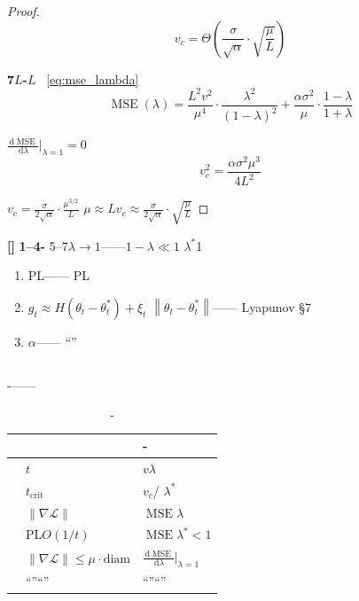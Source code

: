 \documentclass[11pt,a4paper]{article}
\theoremstyle{remark}
\DeclareMathOperator{\MSE}{MSE}
\newcommand{\norm}[1]{\left\lVert#1\right\rVert}
\newcommand{\dd}{\,\mathrm{d}}
\newcommand{\heuristic}{\textnormal{\textbf{[]}}}
\begin{document}
\begin{proof}
\begin{equation}
    v_c = \Theta\left(\frac{\sigma}{\sqrt{\alpha}} \cdot \sqrt{\frac{\mu}{L}}\right)
\end{equation}


\textbf{7$L$-}$L$
~\eqref{eq:mse_lambda}
\begin{equation}
    \MSE(\lambda) = \frac{L^2 v^2}{\mu^4} \cdot \frac{\lambda^2}{(1-\lambda)^2}
    + \frac{\alpha\sigma^2}{\mu} \cdot \frac{1-\lambda}{1+\lambda}
\end{equation}

$\frac{\dd \MSE}{\dd \lambda}\big|_{\lambda=1} = 0$
\begin{equation}
    v_c^2 = \frac{\alpha\sigma^2\mu^3}{4L^2}
\end{equation}

$v_c = \frac{\sigma}{2\sqrt{\alpha}} \cdot \frac{\mu^{3/2}}{L}$
$\mu \approx L$$v_c \approx \frac{\sigma}{2\sqrt{\alpha}} \cdot \sqrt{\frac{\mu}{L}}$

\end{proof}

\heuristic{} \textbf{1--4-}
5--7$\lambda \to 1$——$1-\lambda \ll 1$
$\lambda^*$1
\textbf{}
\begin{enumerate}[label=(\arabic*)]
    \item PL——
          PL
          
    \item $g_t \approx H(\theta_t - \theta_t^*) + \xi_t$
          $\norm{\theta_t - \theta_t^*}$——
          Lyapunov
          \S7
    \item $\alpha$——
          ``''
\end{enumerate}

\subsection{}

-——
\textbf{}

\begin{table}[htbp]
\centering
\caption{-}
\label{tab:phase_parallel}
\begin{tabular}{@{}lll@{}}
\toprule
\textbf{} & \textbf{} & \textbf{-} \\
\midrule
 & $t$ & $v$$\lambda$ \\
 & $t_{\text{crit}}$ & $v_c$/ $\lambda^*$ \\
 & $\|\nabla\mathcal{L}\|$ & $\MSE$$\lambda$ \\
 & PL$O(1/t)$ & $\MSE$$\lambda^*<1$ \\
 & $\|\nabla\mathcal{L}\| \leq \mu \cdot \text{diam}$ & $\frac{\dd \MSE}{\dd \lambda}\big|_{\lambda=1}$ \\
 & ``''``'' & ``''``'' \\
\bottomrule
\end{tabular}
\end{table}
\end{document}
